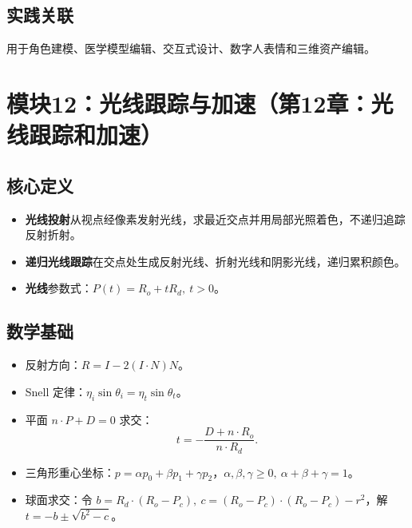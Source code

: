 \documentclass[UTF8,fontset=fandol,11pt]{ctexart}
\newcommand{\key}[1]{\textbf{#1}}
\begin{document}
\subsection{实践关联}
用于角色建模、医学模型编辑、交互式设计、数字人表情和三维资产编辑。

\section{模块12：光线跟踪与加速（第12章：光线跟踪和加速）}
\subsection{核心定义}
\begin{itemize}
  \item \key{光线投射}从视点经像素发射光线，求最近交点并用局部光照着色，不递归追踪反射折射。
  \item \key{递归光线跟踪}在交点处生成反射光线、折射光线和阴影光线，递归累积颜色。
  \item \key{光线}参数式：$P(t)=R_o+tR_d,\ t>0$。
\end{itemize}
\subsection{数学基础}
\begin{itemize}
  \item 反射方向：$R=I-2(I\cdot N)N$。
  \item Snell 定律：$\eta_i\sin\theta_i=\eta_t\sin\theta_t$。
  \item 平面 $n\cdot P+D=0$ 求交：
  \[
    t=-\frac{D+n\cdot R_o}{n\cdot R_d}.
  \]
  \item 三角形重心坐标：$p=\alpha p_0+\beta p_1+\gamma p_2$，$\alpha,\beta,\gamma\ge0,\ \alpha+\beta+\gamma=1$。
  \item 球面求交：令 $b=R_d\cdot(R_o-P_c),\ c=(R_o-P_c)\cdot(R_o-P_c)-r^2$，解 $t=-b\pm\sqrt{b^2-c}$。
\end{itemize}
\end{document}
